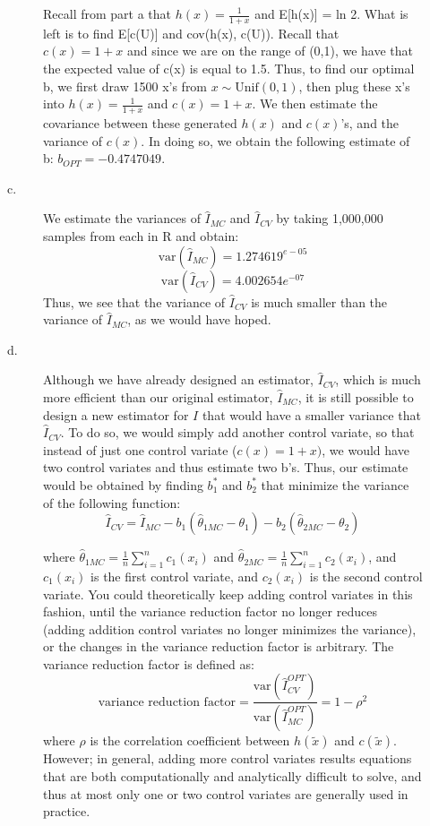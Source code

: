 \documentclass[12pt]{article}
\begin{document}
\begin{description}
\begin{description}
Recall from part a that $h(x)  = \frac{1}{1 + x}$ and E[h(x)] = ln 2. What is left is to find E[c(U)] and cov(h(x), c(U)). Recall that $c(x) = 1 + x$ and since we are on the range of (0,1), we have that the expected value of c(x) is equal to 1.5. Thus, to find our optimal b, we first draw 1500 x's from $x \sim \mathrm{Unif}(0, 1)$, then plug these x's into $h(x) = \frac{1}{1 + x}$ and $c(x) = 1 + x$. We then estimate the covariance between these generated $h(x)$ and $c(x)$'s, and the variance of $c(x)$. In doing so, we obtain the following estimate of b: $b_{OPT} = -0.4747049$. 
\item[c.] We estimate the variances of $\hat{I}_{MC}$ and $\hat{I}_{CV}$ by taking 1,000,000 samples from each in R and obtain:
 \[\mathrm{var}(\hat{I}_{MC}) = 1.274619^{e-05}\] 
\[\mathrm{var}(\hat{I}_{CV}) = 4.002654e^{-07}\]
Thus, we see that the variance of $\hat{I}_{CV}$ is much smaller than the variance of $\hat{I}_{MC}$, as we would have hoped.  
\item[d.] Although we have already designed an estimator, $\hat{I}_{CV}$, which is much more efficient than our original estimator, $\hat{I}_{MC}$, it is still possible to design a new estimator for $I$ that would have a smaller variance that $\hat{I}_{CV}$. To do so, we would simply add another control variate, so that instead of just one control variate ($c(x) = 1 + x)$, we would have two control variates and thus estimate two b's. Thus, our estimate would be obtained by finding $b_1^*$ and $b_2^*$ that minimize the variance of the following function:
\[\hat{I}_{CV} = \hat{I}_{MC} - b_1(\hat{\theta}_{1MC} - \theta_1) - b_2(\hat{\theta}_{2MC} - \theta_2)\]

where $\hat{\theta}_{1MC} = \frac{1}{n} \sum_{i = 1}^n c_1(x_i)$ and $\hat{\theta}_{2MC} = \frac{1}{n} \sum_{i = 1}^n c_2(x_i)$, and $c_1(x_i)$ is the first control variate, and $c_2(x_i)$ is the second control variate. You could theoretically keep adding control variates in this fashion, until the variance reduction factor no longer reduces (adding addition control variates no longer minimizes the variance), or the changes in the variance reduction factor is arbitrary. The variance reduction factor is defined as:
\[\text{variance reduction factor} = \frac{\mathrm{var} (\hat{I}_{CV}^{OPT})}{\mathrm{var}(\hat{I}_{MC}^{OPT})} = 1 - \rho^2\]
where $\rho$ is the correlation coefficient between $h(\tilde{x})$ and $c(\tilde{x})$. However; in general, adding more control variates results equations that are both computationally and analytically difficult to solve, and thus at most only one or two control variates are generally used in practice.  
\end{description}



\end{description}
\end{document}
